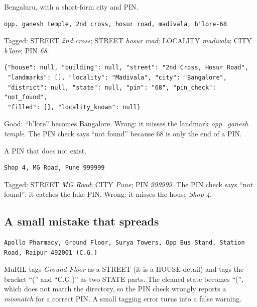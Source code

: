 \documentclass[11pt,a4paper]{article}
\begin{document}
 Bengaluru, with a short-form city and PIN.
\begin{lstlisting}
opp. ganesh temple, 2nd cross, hosur road, madivala, b'lore-68
\end{lstlisting}
Tagged: STREET \emph{2nd cross}; STREET \emph{hosur road}; LOCALITY \emph{madivala}; CITY \emph{b'lore}; PIN
\emph{68}.
\begin{lstlisting}
{"house": null, "building": null, "street": "2nd Cross, Hosur Road",
 "landmarks": [], "locality": "Madivala", "city": "Bangalore",
 "district": null, "state": null, "pin": "68", "pin_check": "not_found",
 "filled": [], "locality_known": null}
\end{lstlisting}
Good: ``b'lore'' becomes Bangalore. Wrong: it misses the landmark \emph{opp.\ ganesh temple}. The PIN check says
``not found'' because 68 is only the end of a PIN.

 A PIN that does not exist.
\begin{lstlisting}
Shop 4, MG Road, Pune 999999
\end{lstlisting}
Tagged: STREET \emph{MG Road}; CITY \emph{Pune}; PIN \emph{999999}. The PIN check says ``not found'': it catches the
fake PIN. Wrong: it misses the house \emph{Shop 4}.

\subsection{A small mistake that spreads}
\begin{lstlisting}
Apollo Pharmacy, Ground Floor, Surya Towers, Opp Bus Stand, Station Road, Raipur 492001 (C.G.)
\end{lstlisting}
MuRIL tags \emph{Ground Floor} as a STREET (it is a HOUSE detail) and tags the bracket ``('' and ``C.G.)'' as two
STATE parts. The cleaned state becomes ``('', which does not match the directory, so the PIN check wrongly reports a
\emph{mismatch} for a correct PIN. A small tagging error turns into a false warning.
\end{document}
